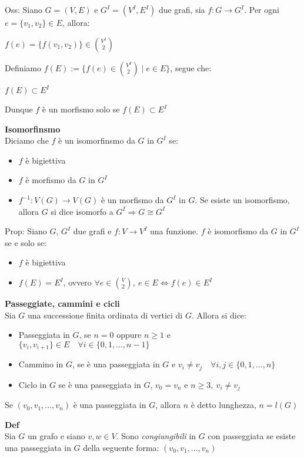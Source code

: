 \documentclass[12pt, a4paper]{article}
\begin{document}
Oss: Siano $G=(V,E)$ e $G^{I}=(V^{I},E^{I})$ due grafi, sia $f:G\rightarrow G^{I}$. Per ogni 
$e=\{v_{1},v_{2}\}\in E$, allora:
\begin{center}
    $f(e)=\{f(v_{1},v_{2})\}\in\binom{V^{I}}{2}$
\end{center}
Definiamo $f(E):=\{f(e)\in\binom{V^{I}}{2}\mid e\in E\}$, segue che:
\begin{center}
    $f(E)\subset E^{I}$
\end{center}
Dunque $f$ è un morfismo solo se $f(E)\subset E^{I}$

\textbf{Isomorfinsmo}\\ Diciamo che $f$ è un isomorfinsmo da $G$ in $G^{I}$ se:
\begin{itemize}
    \item $f$ è bigiettiva
    \item $f$ è morfismo da $G$ in $G^{I}$
    \item $f^{-1}:V(G)\rightarrow V(G)$ è un morfismo da $G^{I}$ in $G$. Se esiste un isomorfismo, allora
    $G$ si dice isomorfo a $G^{I}\Rightarrow G\cong G^{I}$
\end{itemize}

Prop: Siano $G$, $G^{I}$ due grafi e $f:V\rightarrow V^{I}$ una funzione. $f$ è isomorfismo da $G$ in $G^{I}$ 
se e solo se:
\begin{itemize}
    \item $f$ è bigiettiva
    \item $f(E)=E^{I}$, ovvero $\forall e\in\binom{V}{2},\ e\in E\Leftrightarrow f(e)\in E^{I}$
\end{itemize}

\newpage
\textbf{Passeggiate, cammini e cicli}\\ Sia $G$ una successione finita ordinata di vertici di $G$. Allora si dice:
\begin{itemize}
    \item Passeggiata in $G$, se $n=0$ oppure $n\geq 1$ e $\{v_{i},v_{i+1}\}\in E\quad\forall i\in\{0,1,...,n-1\}$
    \item Cammino in $G$, se è una passeggiata in $G$ e $v_{i}\neq v_{j}\quad\forall i,j\in\{0,1,...,n\}$
    \item Ciclo in $G$ se è una passeggiata in $G$, $v_{0}=v_{n}$ e $n\geq 3,\ v_{i}\neq v_{j}$
\end{itemize}
Se $(v_{0},v_{1},...,v_{n})$ è una passeggiata in $G$, allora $n$ è detto lunghezza, $n=l(G)$

\textbf{Def}\\ Sia $G$ un grafo e siano $v,w\in V$. Sono \textit{congiungibili} in $G$ con passeggiata se 
esiste una passeggiata in $G$ della seguente forma: $(v_{0},v_{1},...,v_{n})$
\end{document}
